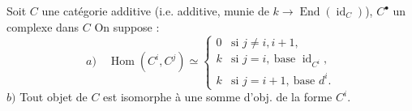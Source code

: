 Soit $C$ une catégorie additive (i.e. additive, munie
de  $k\longrightarrow\operatorname{End}(\operatorname{id}_C)$), $C^\bullet$ un complexe  dans
$C$
On suppose :
\[
a)\quad\operatorname{Hom}(C^i,C^j)\simeq
\begin{cases}
0&\text{si }j\ne i,i+1,\\
k&\text{si }j=i,\ \text{base }\operatorname{id}_{C^i},\\
k&\text{si }j=i+1,\ \text{base }d^i.
\end{cases}
\]
$b)$ Tout objet de $C$ est isomorphe à une
somme  d'obj. de la forme $C^i$.

